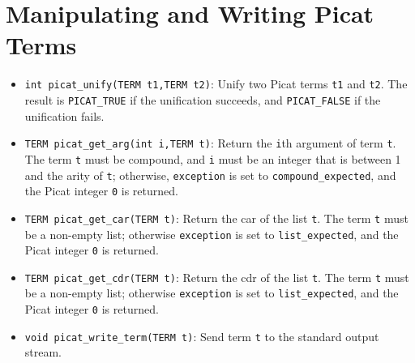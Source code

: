 \section{Manipulating and Writing Picat Terms} 
\begin{itemize}
\item \texttt{int picat\_unify(TERM t1,TERM t2)}: Unify two Picat terms \texttt{t1} and \texttt{t2}. The result is \texttt{PICAT\_TRUE} if the unification succeeds, and \texttt{PICAT\_FALSE} if the unification fails.

\item \texttt{TERM picat\_get\_arg(int i,TERM t)}: Return the \texttt{i}th argument of term \texttt{t}. The term \texttt{t} must be compound, and \texttt{i} must be an integer that is between 1 and the arity of \texttt{t}; otherwise, \texttt{exception} is set to \texttt{compound\_expected}, and the Picat integer \texttt{0} is returned.

\item \texttt{TERM picat\_get\_car(TERM t)}: Return the car of the list \texttt{t}. The term \texttt{t} must be a non-empty list; otherwise \texttt{exception} is set to \texttt{list\_expected}, and the Picat integer \texttt{0} is returned.

\item \texttt{TERM picat\_get\_cdr(TERM t)}: Return the cdr of the list \texttt{t}. The term \texttt{t} must be a non-empty list; otherwise \texttt{exception} is set to \texttt{list\_expected}, and the Picat integer \texttt{0} is returned.

\item \texttt{void picat\_write\_term(TERM t)}: Send term \texttt{t} to the standard output stream.
\end{itemize}

